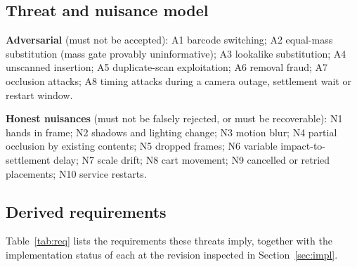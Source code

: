 \documentclass[conference]{IEEEtran}
\begin{document}
\subsection{Threat and nuisance model}
\textbf{Adversarial} (must not be accepted): A1 barcode switching; A2 equal-mass substitution (mass
gate provably uninformative); A3 lookalike substitution; A4 unscanned insertion; A5 duplicate-scan
exploitation; A6 removal fraud; A7 occlusion attacks; A8 timing attacks during a camera outage,
settlement wait or restart window.

\textbf{Honest nuisances} (must not be falsely rejected, or must be recoverable): N1 hands in frame;
N2 shadows and lighting change; N3 motion blur; N4 partial occlusion by existing contents; N5 dropped
frames; N6 variable impact-to-settlement delay; N7 scale drift; N8 cart movement; N9 cancelled or
retried placements; N10 service restarts.

\subsection{Derived requirements}
Table~\ref{tab:req} lists the requirements these threats imply, together with the implementation
status of each at the revision inspected in Section~\ref{sec:impl}.
\end{document}
